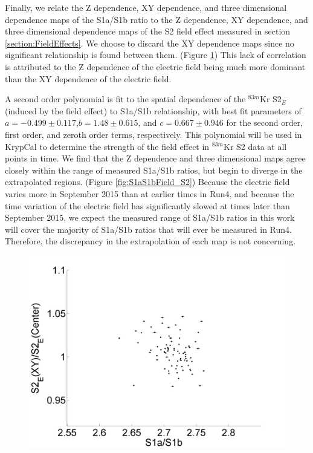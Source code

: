 Finally, we relate the Z dependence, XY dependence, and three dimensional dependence maps of the S1a/S1b ratio to the Z dependence, XY dependence, and three dimensional dependence maps of the S2 field effect measured in section \ref{section:FieldEffects}.  We choose to discard the XY dependence maps since no significant relationship is found between them. (Figure \ref{fig:S1aS1bField_S2XY}) This lack of correlation is attributed to the Z dependence of the electric field being much more dominant than the XY dependence of the electric field.  


A second order polynomial is fit to the spatial dependence of the $^{83m}$Kr S2$_E$ (induced by the field effect) to S1a/S1b relationship, with best fit parameters of $a=-0.499 \pm 0.117$,$b=1.48 \pm 0.615$, and $c=0.667 \pm 0.946$ for the second order, first order, and zeroth order terms, respectively.  This polynomial will be used in KrypCal to determine the strength of the field effect in $^{83m}$Kr S2 data at all points in time.  We find that the Z dependence and three dimensional maps agree closely within the range of measured S1a/S1b ratios, but begin to diverge in the extrapolated regions. (Figure \ref{fig:S1aS1bField_S2})  Because the electric field varies more in September 2015 than at earlier times in Run4, and because the time variation of the electric field has significantly slowed at times later than September 2015, we expect the measured range of S1a/S1b ratios in this work will cover the majority of S1a/S1b ratios that will ever be measured in Run4. Therefore, the discrepancy in the extrapolation of each map is not concerning. 

\begin{figure}[!h]
\includegraphics[scale=0.6]{Run04Corrections/S1aS1bVField_XYDep.png}
 \label{fig:S1aS1bField_S2XY}
\end{figure}

